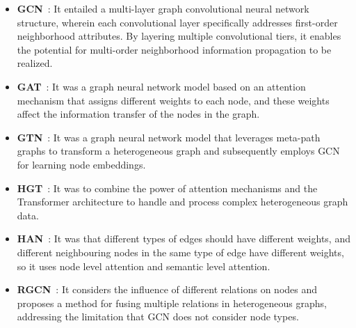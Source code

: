 \begin{itemize}[leftmargin=*]
    \item {\bf GCN}~\cite{kipf2016semi}: It entailed a multi-layer graph convolutional neural network structure, wherein each convolutional layer specifically addresses first-order neighborhood attributes. By layering multiple convolutional tiers, it enables the potential for multi-order neighborhood information propagation to be realized.

    \item {\bf GAT}~\cite{velivckovic2017graph}: It was a graph neural network model based on an attention mechanism that assigns different weights to each node, and these weights affect the information transfer of the nodes in the graph.

    \item {\bf GTN}~\cite{yun2019graph}: It was a graph neural network model that leverages meta-path graphs to transform a heterogeneous graph and subsequently employs GCN for learning node embeddings. 
    
    \item {\bf HGT}~\cite{hu2020heterogeneous}: It was to combine the power of attention mechanisms and the Transformer architecture to handle and process complex heterogeneous graph data.

    \item {\bf HAN}~\cite{wang2019heterogeneous}: It was that different types of edges should have different weights, and different neighbouring nodes in the same type of edge have different weights, so it uses node level attention and semantic level attention.

    \item {\bf RGCN}~\cite{schlichtkrull2018modeling}: It considers the influence of different relations on nodes and proposes a method for fusing multiple relations in heterogeneous graphs, addressing the limitation that GCN does not consider node types.


\end{itemize}
